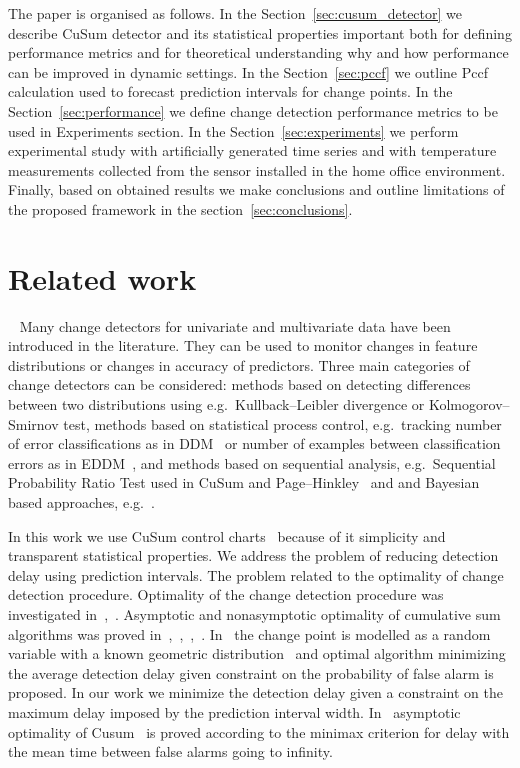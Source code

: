 The paper is organised as follows.
In the Section~\ref{sec:cusum_detector} we describe CuSum detector and its statistical properties important both for defining performance metrics and for theoretical understanding why and how performance can be improved in dynamic settings.
In the Section~\ref{sec:pccf} we outline Pccf calculation used to forecast prediction intervals for change points.
In the Section~\ref{sec:performance} we define change detection performance metrics to be used in Experiments section.
In the Section~\ref{sec:experiments} we perform experimental study with artificially generated time series and with temperature measurements collected from the sensor installed in the home office environment.
Finally, based on obtained results we make conclusions and outline limitations of the proposed framework in the section~\ref{sec:conclusions}.


\section{Related work}~\label{sec:related_work}
Many change detectors for univariate and multivariate data have been introduced in the literature. They can be used to monitor changes in feature distributions or changes in accuracy of predictors. Three main categories of change detectors can be considered: methods based on detecting differences between two distributions using e.g.\ Kullback–Leibler divergence or Kolmogorov–Smirnov test, methods based on statistical process control, e.g.\ tracking number of error classifications as in DDM~\cite{gama2004learning} or number of examples between classification errors as in EDDM~\cite{baena2006early}, and methods based on sequential analysis, e.g.\ Sequential Probability Ratio Test used in CuSum and Page–Hinkley~\cite{Page1954} and and Bayesian based approaches, e.g.~\cite{girshick1952bayes}. 

In this work we use CuSum control charts~\cite{Page1954} because of it simplicity and transparent statistical properties.
We address the problem of reducing detection delay using prediction intervals. 
The problem related to the optimality of change detection procedure.
Optimality of the change detection procedure was investigated in~\cite{Page1954},~\cite{Shiryaev2010,Shiryaev1961,Shiryaev1963}.
Asymptotic and nonasymptotic optimality of cumulative sum algorithms was proved in~\cite{lorden1971procedures},~\cite{moustakides1986optimal},~\cite{moustakides2004optimality},~\cite{ritov1990decision}.
In~\cite{Shiryaev1963,shiryaev2007optimal} the change point is modelled as a random variable with a known geometric distribution~\cite{veeravalli2014quickest} and optimal algorithm minimizing the average detection delay given constraint on the probability of false alarm is proposed. In our work we minimize the detection delay given a constraint on the maximum delay imposed by the prediction interval width. In~\cite{lorden1971procedures} asymptotic optimality of Cusum~\cite{Page1954} is proved according to the minimax criterion for delay with the mean time between false alarms going to infinity. 

